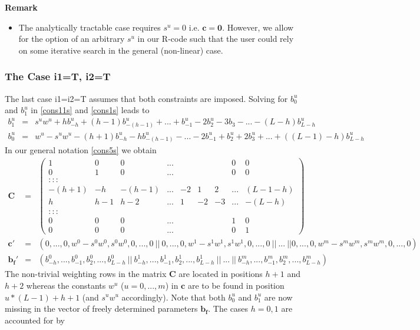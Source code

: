\documentclass[11pt]{article}
\begin{document}
\textbf{Remark}
\begin{itemize}
\item The analytically tractable case requires $s^u=0$ i.e. $\mathbf{c=0}$. However, we allow for the option of an arbitrary $s^u$ in our R-code such that 
the user could rely on some iterative search in the general (non-linear) case. 
\end{itemize}


\subsubsection{The Case i1=T, i2=T}

The last case i1=i2=T assumes that both constraints are imposed. Solving for $b_0^u$ and $b_1^u$ in \ref{cons11s} and \ref{cons1s} leads to
\begin{eqnarray*}%
b_{1}^u&=&s^uw^u+hb_{-h}^u+(h-1)b_{-(h-1)}^u+...+b_{-1}^u-2b_{2}^u-3b_{3}-...-(L-h)b_{L-h}^u\\
b_{0}^u&=&w^u-s^uw^u-(h+1)b_{-h}^u-hb_{-(h-1)}^u-...-2b_{-1}^u+b_{2}^u+2b_3^u+...+((L-1)-h)b_{L-h}^u%
\end{eqnarray*}
In our general notation  \ref{cons5s}  we obtain
\begin{eqnarray}\label{cons77s}
\mathbf{C}&=&\left(\begin{array}{ccccccccc}
1&0&0&...&&&&0&0\\
0&1&0&...&&&&0&0\\
:::\\
-(h+1)&-h&-(h-1)&...&-2&1&2&...&(L-1-h)\\
h&h-1&h-2&...&1&-2&-3&...&-(L-h)\\
:::\\
0&0&0&...&&&&1&0\\
0&0&0&...&&&&0&1
\end{array}\right)\\
\mathbf{c}'&=&(0,...,0,w^0-s^0w^0,s^0w^0,0,...,0~||~0,...,0,w^1-s^1w^1,s^1w^1,0,...,0~||~...~||0,...,0,w^m-s^mw^m,s^mw^m,0,...,0)\nonumber\\
\mathbf{b_f}'&=&(b_{-h}^0,...,b_{-1}^0,b_2^0,...,b_{L-h}^0~||~b_{-h}^1,...,b_{-1}^1,b_2^1,...,b_{L-h}^1~||~...~||~b_{-h}^m,...,b_{-1}^m,b_2^m,...,b_{L-h}^m)\nonumber
\end{eqnarray}
The non-trivial weighting rows in the matrix $\mathbf{C}$ are located in positions $h+1$ and $h+2$ whereas the constants $w^u$ ($u=0,...,m$) in $\mathbf{c}$ are to be found in position $u*(L-1)+h+1$ (and $s^uw^u$ accordingly). Note that both $b_0^u$ and $b_1^u$ are now missing in the vector of freely determined parameters $\mathbf{b_f}$. The cases $h=0,1$ are accounted for by 
\end{document}
